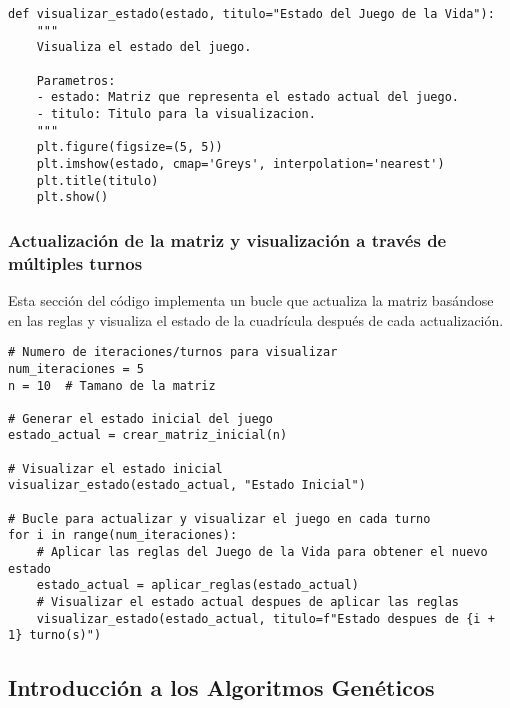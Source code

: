 \begin{lstlisting}
def visualizar_estado(estado, titulo="Estado del Juego de la Vida"):
    """
    Visualiza el estado del juego.
    
    Parametros:
    - estado: Matriz que representa el estado actual del juego.
    - titulo: Titulo para la visualizacion.
    """
    plt.figure(figsize=(5, 5))
    plt.imshow(estado, cmap='Greys', interpolation='nearest')
    plt.title(titulo)
    plt.show()
\end{lstlisting}

\subsubsection*{Actualización de la matriz y visualización a través de múltiples turnos}

Esta sección del código implementa un bucle que actualiza la matriz basándose en las reglas y 
visualiza el estado de la cuadrícula después de cada actualización.

\begin{lstlisting}
# Numero de iteraciones/turnos para visualizar
num_iteraciones = 5
n = 10  # Tamano de la matriz

# Generar el estado inicial del juego
estado_actual = crear_matriz_inicial(n)

# Visualizar el estado inicial
visualizar_estado(estado_actual, "Estado Inicial")

# Bucle para actualizar y visualizar el juego en cada turno
for i in range(num_iteraciones):
    # Aplicar las reglas del Juego de la Vida para obtener el nuevo estado
    estado_actual = aplicar_reglas(estado_actual)
    # Visualizar el estado actual despues de aplicar las reglas
    visualizar_estado(estado_actual, titulo=f"Estado despues de {i + 1} turno(s)")
\end{lstlisting}


\subsection{Introducción a los Algoritmos Genéticos}






